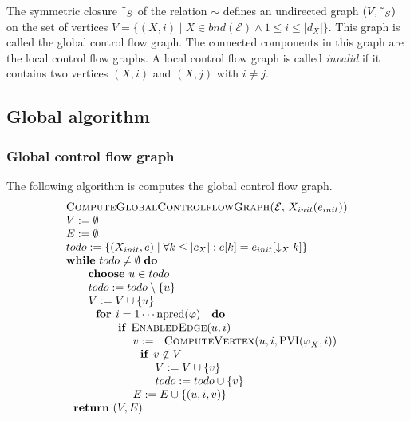 The symmetric closure $\symbol{126}_{S}$ of the relation $\sim $ defines an
undirected graph $(V,\symbol{126}_{S})$ on the set of vertices $%
V=\{(X,i)\mid X\in bnd(\mathcal{E})\wedge 1\leq i\leq \left\vert
d_{X}\right\vert \}$. This graph is called the global control flow graph.
The connected components in this graph are the local control flow graphs. A
local control flow graph is called \emph{invalid} if it contains two
vertices $(X,i)$ and $(X,j)$ with $i\neq j$. \newpage

\subsection{Global algorithm}

\subsubsection{Global control flow graph}

The following algorithm is computes the global control flow graph.%
\begin{equation*}
\begin{tabular}{l}
\textsc{ComputeGlobalControlflowGraph(}$\mathcal{E}$, $X_{init}(e_{init})$%
\textsc{)} \\ 
$V:=\emptyset $ \\ 
$E:=\emptyset $ \\ 
$todo:=\{(X_{init},e)\mid \forall k\leq \left\vert c_{X}\right\vert
:e[k]=e_{init}[\downarrow _{X}k]\}$ \\ 
\textbf{while} $todo\neq \emptyset $ \textbf{do} \\ 
$\qquad $\textbf{choose} $u\in todo$ \\ 
$\qquad todo:=todo\setminus \{u\}$ \\ 
$\qquad V:=V\cup \{u\}$ \\ 
$\qquad \text{\textbf{for }}i=1\cdots \mathrm{npred}(\varphi )\text{ \textbf{%
do}}$ \\ 
$\qquad \qquad \text{\textbf{if }\textsc{EnabledEdge}}(u,i)$ \\ 
$\qquad \qquad \qquad v:=\text{\textsc{ComputeVertex}}(u,i,\mathrm{PVI}%
(\varphi _{X},i))$ \\ 
$\qquad \qquad \qquad \text{\textbf{if }}v\notin V$ \\ 
$\qquad \qquad \qquad \qquad V:=V\cup \{v\}$ \\ 
$\qquad \qquad \qquad \qquad todo:=todo\cup \{v\}$ \\ 
$\qquad \qquad \qquad E:=E\cup \{(u,i,v)\}$ \\ 
$\text{\textbf{return} }(V,E)$%
\end{tabular}%
\end{equation*}

